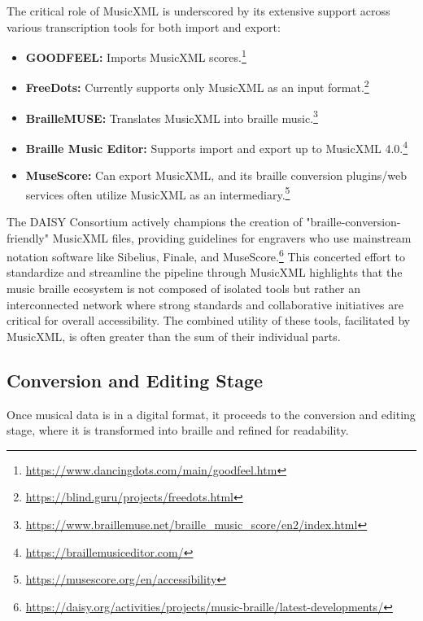 The critical role of MusicXML is underscored by its extensive support across various transcription tools for both import and export:
\begin{itemize}[noitemsep,topsep=0pt]
    \item \textbf{GOODFEEL:} Imports MusicXML scores.\footnote{\url{https://www.dancingdots.com/main/goodfeel.htm}}
    \item \textbf{FreeDots:} Currently supports only MusicXML as an input format.\footnote{\url{https://blind.guru/projects/freedots.html}}
    \item \textbf{BrailleMUSE:} Translates MusicXML into braille music.\footnote{\url{https://www.braillemuse.net/braille_music_score/en2/index.html}}
    \item \textbf{Braille Music Editor:} Supports import and export up to MusicXML 4.0.\footnote{\url{https://braillemusiceditor.com/}}
    \item \textbf{MuseScore:} Can export MusicXML, and its braille conversion plugins/web services often utilize MusicXML as an intermediary.\footnote{\url{https://musescore.org/en/accessibility}}
\end{itemize}

The DAISY Consortium actively champions the creation of "braille-conversion-friendly" MusicXML files, providing guidelines for engravers who use mainstream notation software like Sibelius, Finale, and MuseScore.\footnote{\url{https://daisy.org/activities/projects/music-braille/latest-developments/}} This concerted effort to standardize and streamline the pipeline through MusicXML highlights that the music braille ecosystem is not composed of isolated tools but rather an interconnected network where strong standards and collaborative initiatives are critical for overall accessibility. The combined utility of these tools, facilitated by MusicXML, is often greater than the sum of their individual parts.

\subsection{Conversion and Editing Stage}
Once musical data is in a digital format, it proceeds to the conversion and editing stage, where it is transformed into braille and refined for readability.

